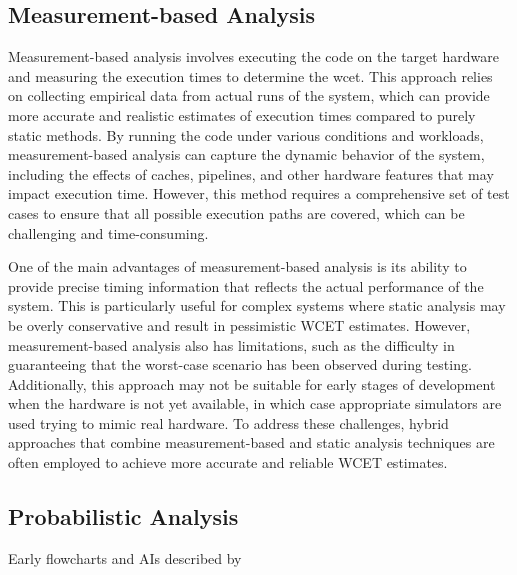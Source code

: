 \subsection{Measurement-based Analysis}\label{sec:measurement_analysis}
Measurement-based analysis involves executing the code on the target hardware and measuring the execution times to determine the \ac{wcet}. 
This approach relies on collecting empirical data from actual runs of the system, which can provide more accurate and realistic estimates of execution times compared to purely static methods. 
By running the code under various conditions and workloads, measurement-based analysis can capture the dynamic behavior of the system, including the effects of caches, pipelines, and other hardware features that may impact execution time.
However, this method requires a comprehensive set of test cases to ensure that all possible execution paths are covered, which can be challenging and time-consuming\cite{wilhelmWorstcaseExecutiontimeProblem2008}.

One of the main advantages of measurement-based analysis is its ability to provide precise timing information that reflects the actual performance of the system. 
This is particularly useful for complex systems where static analysis may be overly conservative and result in pessimistic WCET estimates.
However, measurement-based analysis also has limitations, such as the difficulty in guaranteeing that the worst-case scenario has been observed during testing. 
Additionally, this approach may not be suitable for early stages of development when the hardware is not yet available, in which case appropriate simulators are used trying to mimic real hardware.\cite{wilhelmWorstcaseExecutiontimeProblem2008}
To address these challenges, hybrid approaches that combine measurement-based and static analysis techniques are often employed to achieve more accurate and reliable WCET estimates\cite{kelterWCETAnalysisOptimization}.

\subsection{Probabilistic Analysis}
\label{sec:probabilistic_analysis}

Early flowcharts and \ac{AI}s described by \textcite{cousotAbstractInterpretationUnified1977}


